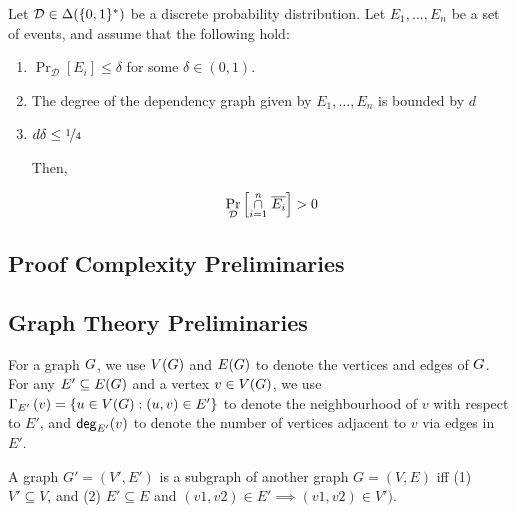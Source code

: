 \documentclass[11pt]{article}
\newcommand{\DistSet}[1]{\Delta(#1)}
\newcommand{\Dist}{\mathcal{D}}
\newcommand{\PProb}[2]{\Pr_{#2}\left[#1 \right]}
\begin{document}
\begin{lemma}\label{lemma:lll}Let $\Dist \in \DistSet{\bit^*}$ be a discrete probability distribution.
Let $E_1,...,E_n$ be a set of events, and assume that the following hold:

\begin{enumerate}
	\item $\PProb{E_i}{\Dist} \leq \delta$ for some $\delta \in (0,1)$.
	\item The degree of the dependency graph given by $E_1, \dots, E_n$ is bounded by $d$
	\item $d\delta \leq \nicefrac{1}{4}$
	
Then, 

\[ \PProb{\overset{n}{ \underset{i=1}{\cap}} \hspace{0.1cm}  \overline{E_i}}{\Dist} > 0\]	
\end{enumerate}
	
\end{lemma}

\subsection{Proof Complexity Preliminaries}

\begin{definition}\label{def:poly-calc-refutations}
	
\end{definition}

\subsection{Graph Theory Preliminaries}

For a graph $G$, we use $V(G)$ and $E(G)$ to denote the vertices and edges of $G$. 
For any $E' \subseteq E(G)$ and a vertex $v \in V(G)$, we use $\Gamma_{E'}\left(v\right) = \{ u \in V(G) : (u,v) \in E' \}$ to denote the neighbourhood of $v$ with respect to $E'$, and $\mathsf{deg}_{E'}(v)$ to denote the number of vertices adjacent to $v$ via edges in $E'$.

\begin{definition}[Subgraph]\label{def:subgraph}
A graph $G'=(V', E')$ is a subgraph of another graph $G=(V, E)$ iff (1) $V'\subseteq V$, and (2) $E'\subseteq E$ and  $(v1, v2) \in E' \implies (v1, v2) \in V')$.
	
\end{definition}
\end{document}
